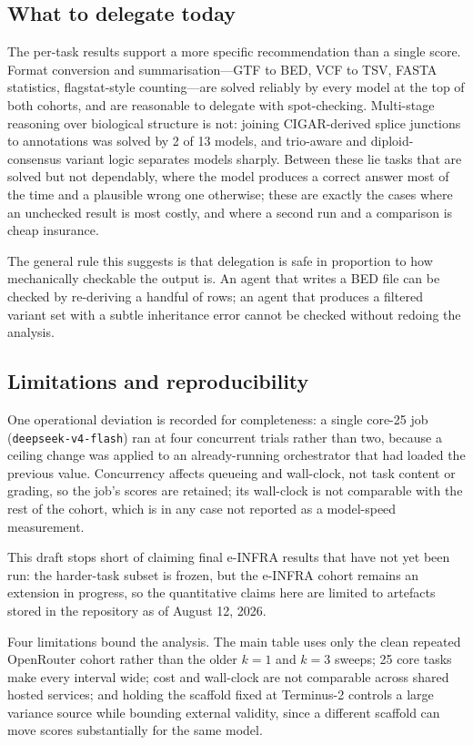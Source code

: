 \documentclass[11pt]{article}
\begin{document}
\subsection*{What to delegate today}

The per-task results support a more specific recommendation than a single score.
Format conversion and summarisation---GTF to BED, VCF to TSV, FASTA statistics, flagstat-style counting---are solved reliably by every model at the top of both cohorts, and are reasonable to delegate with spot-checking.
Multi-stage reasoning over biological structure is not: joining CIGAR-derived splice junctions to annotations was solved by 2 of 13 models, and trio-aware and diploid-consensus variant logic separates models sharply.
Between these lie tasks that are solved but not dependably, where the model produces a correct answer most of the time and a plausible wrong one otherwise; these are exactly the cases where an unchecked result is most costly, and where a second run and a comparison is cheap insurance.

The general rule this suggests is that delegation is safe in proportion to how mechanically checkable the output is.
An agent that writes a BED file can be checked by re-deriving a handful of rows; an agent that produces a filtered variant set with a subtle inheritance error cannot be checked without redoing the analysis.

\subsection*{Limitations and reproducibility}

One operational deviation is recorded for completeness: a single core-25 job (\texttt{deepseek-v4-flash}) ran at four concurrent trials rather than two, because a ceiling change was applied to an already-running orchestrator that had loaded the previous value.
Concurrency affects queueing and wall-clock, not task content or grading, so the job's scores are retained; its wall-clock is not comparable with the rest of the cohort, which is in any case not reported as a model-speed measurement.

This draft stops short of claiming final e-INFRA results that have not yet been run: the harder-task subset is frozen, but the e-INFRA cohort remains an extension in progress, so the quantitative claims here are limited to artefacts stored in the repository as of August 12, 2026.

Four limitations bound the analysis.
The main table uses only the clean repeated OpenRouter cohort rather than the older $k=1$ and $k=3$ sweeps; 25 core tasks make every interval wide; cost and wall-clock are not comparable across shared hosted services; and holding the scaffold fixed at Terminus-2 controls a large variance source while bounding external validity, since a different scaffold can move scores substantially for the same model.
\end{document}

